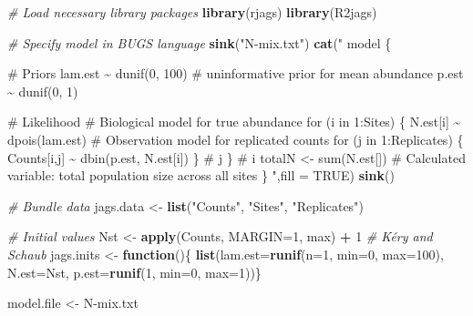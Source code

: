 \documentclass[
]{krantz}
\makeatletter
\newenvironment{Shaded}{\begin{snugshade}}{\end{snugshade}}
\newcommand{\AttributeTok}[1]{\textcolor[rgb]{0.27,0.27,0.27}{#1}}
\newcommand{\CommentTok}[1]{\textcolor[rgb]{0.37,0.37,0.37}{\textit{#1}}}
\newcommand{\ConstantTok}[1]{\textcolor[rgb]{0.37,0.37,0.37}{#1}}
\newcommand{\ControlFlowTok}[1]{\textcolor[rgb]{0.27,0.27,0.27}{\textbf{#1}}}
\newcommand{\DecValTok}[1]{\textcolor[rgb]{0.06,0.06,0.06}{#1}}
\newcommand{\FunctionTok}[1]{\textcolor[rgb]{0.27,0.27,0.27}{\textbf{#1}}}
\newcommand{\NormalTok}[1]{#1}
\newcommand{\OtherTok}[1]{\textcolor[rgb]{0.37,0.37,0.37}{#1}}
\newcommand{\SpecialCharTok}[1]{\textcolor[rgb]{0.43,0.43,0.43}{\textbf{#1}}}
\newcommand{\StringTok}[1]{\textcolor[rgb]{0.5,0.5,0.5}{#1}}
\newenvironment{kframe}{%
\medskip{}
\setlength{\fboxsep}{.8em}
 \def\at@end@of@kframe{}%
 \ifinner\ifhmode%
  \def\at@end@of@kframe{\end{minipage}}%
  \begin{minipage}{\columnwidth}%
 \fi\fi%
 \def\FrameCommand##1{\hskip\@totalleftmargin \hskip-\fboxsep
 \colorbox{shadecolor}{##1}\hskip-\fboxsep
     \hskip-\linewidth \hskip-\@totalleftmargin \hskip\columnwidth}%
 \MakeFramed {\advance\hsize-\width
   \@totalleftmargin\z@ \linewidth\hsize
   \@setminipage}}%
 {\par\unskip\endMakeFramed%
 \at@end@of@kframe}
\renewenvironment{Shaded}{\begin{kframe}}{\end{kframe}}
\makeatother
\begin{document}
\begin{Shaded}
\begin{Highlighting}[]
\CommentTok{\# Load necessary library packages}
\FunctionTok{library}\NormalTok{(rjags)}
\FunctionTok{library}\NormalTok{(R2jags)}

\CommentTok{\# Specify model in BUGS language}
\FunctionTok{sink}\NormalTok{(}\StringTok{"N{-}mix.txt"}\NormalTok{)}
\FunctionTok{cat}\NormalTok{(}\StringTok{"}
\StringTok{model \{}

\StringTok{\# Priors}
\StringTok{  lam.est \textasciitilde{} dunif(0, 100)  \# uninformative prior for mean abundance}
\StringTok{  p.est \textasciitilde{} dunif(0, 1)}

\StringTok{\# Likelihood}
\StringTok{\# Biological model for true abundance}
\StringTok{for (i in 1:Sites) \{}
\StringTok{   N.est[i] \textasciitilde{} dpois(lam.est)}
\StringTok{   \# Observation model for replicated counts}
\StringTok{   for (j in 1:Replicates) \{}
\StringTok{      Counts[i,j] \textasciitilde{} dbin(p.est, N.est[i])}
\StringTok{      \} \# j}
\StringTok{   \} \# i}
\StringTok{totalN \textless{}{-} sum(N.est[])     }
\StringTok{  \# Calculated variable: total population size across all sites}
\StringTok{\}}
\StringTok{"}\NormalTok{,}\AttributeTok{fill =} \ConstantTok{TRUE}\NormalTok{)}
\FunctionTok{sink}\NormalTok{()}

\CommentTok{\# Bundle data}
\NormalTok{jags.data }\OtherTok{\textless{}{-}} \FunctionTok{list}\NormalTok{(}\StringTok{"Counts"}\NormalTok{, }\StringTok{"Sites"}\NormalTok{, }\StringTok{"Replicates"}\NormalTok{)}

\CommentTok{\# Initial values}
\NormalTok{Nst }\OtherTok{\textless{}{-}} \FunctionTok{apply}\NormalTok{(Counts, }\AttributeTok{MARGIN=}\DecValTok{1}\NormalTok{, max) }\SpecialCharTok{+} \DecValTok{1} \CommentTok{\# Kéry and Schaub}
\NormalTok{jags.inits }\OtherTok{\textless{}{-}} \ControlFlowTok{function}\NormalTok{()\{ }\FunctionTok{list}\NormalTok{(}\AttributeTok{lam.est=}\FunctionTok{runif}\NormalTok{(}\AttributeTok{n=}\DecValTok{1}\NormalTok{, }\AttributeTok{min=}\DecValTok{0}\NormalTok{, }\AttributeTok{max=}\DecValTok{100}\NormalTok{),}
                               \AttributeTok{N.est=}\NormalTok{Nst, }\AttributeTok{p.est=}\FunctionTok{runif}\NormalTok{(}\DecValTok{1}\NormalTok{, }\AttributeTok{min=}\DecValTok{0}\NormalTok{, }\AttributeTok{max=}\DecValTok{1}\NormalTok{))\}}

\NormalTok{model.file }\OtherTok{\textless{}{-}} \StringTok{\textquotesingle{}N{-}mix.txt\textquotesingle{}}


\end{Highlighting}
\end{Shaded}
\end{document}
